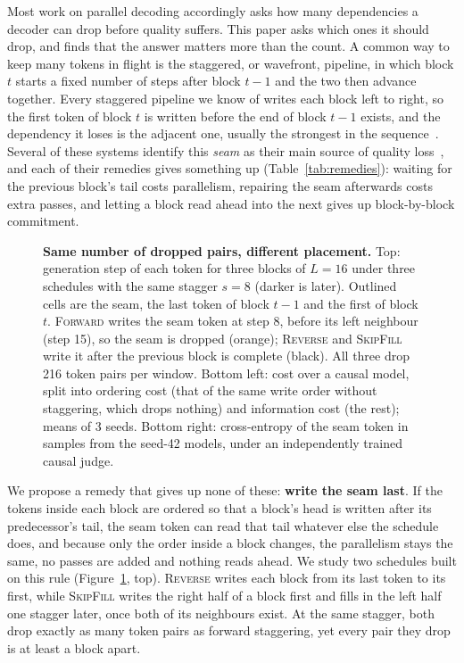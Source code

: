 \documentclass{article}
\theoremstyle{definition}
\theoremstyle{remark}
\newcommand{\name}[1]{\textup{\textsc{#1}}}
\newcommand{\sfill}{\name{SkipFill}\xspace}
\newcommand{\rev}{\name{Reverse}\xspace}
\newcommand{\fwd}{\name{Forward}\xspace}
\begin{document}
Most work on parallel decoding accordingly asks how many dependencies a decoder can drop before quality suffers.
This paper asks which ones it should drop, and finds that the answer matters more than the count.
A common way to keep many tokens in flight is the staggered, or wavefront, pipeline, in which block $t$ starts a fixed number of steps after block $t-1$ and the two then advance together.
Every staggered pipeline we know of writes each block left to right, so the first token of block $t$ is written before the end of block $t-1$ exists, and the dependency it loses is the adjacent one, usually the strongest in the sequence~\citep{wang2025par,li2025refusion}.
Several of these systems identify this \emph{seam} as their main source of quality loss~\citep{he2025zipar,li2026lclm,zhang2026latlm,he2026psf}, and each of their remedies gives something up (Table~\ref{tab:remedies}): waiting for the previous block's tail costs parallelism, repairing the seam afterwards costs extra passes, and letting a block read ahead into the next gives up block-by-block commitment.

\begin{figure}[t]
  \centering
  \resizebox{\textwidth}{!}{}
  \par\medskip
  
  \caption{\textbf{Same number of dropped pairs, different placement.}
  Top: generation step of each token for three blocks of $L=16$ under three schedules with the same stagger $s=8$ (darker is later). Outlined cells are the seam, the last token of block $t-1$ and the first of block $t$. \fwd writes the seam token at step 8, before its left neighbour (step 15), so the seam is dropped (orange); \rev and \sfill write it after the previous block is complete (black). All three drop 216 token pairs per window.
  Bottom left: cost over a causal model, split into ordering cost (that of the same write order without staggering, which drops nothing) and information cost (the rest); means of 3 seeds.
  Bottom right: cross-entropy of the seam token in samples from the seed-42 models, under an independently trained causal judge.}
  \label{fig:teaser}
\end{figure}

We propose a remedy that gives up none of these: \textbf{write the seam last}.
If the tokens inside each block are ordered so that a block's head is written after its predecessor's tail, the seam token can read that tail whatever else the schedule does, and because only the order inside a block changes, the parallelism stays the same, no passes are added and nothing reads ahead.
We study two schedules built on this rule (Figure~\ref{fig:teaser}, top).
\rev writes each block from its last token to its first, while \sfill writes the right half of a block first and fills in the left half one stagger later, once both of its neighbours exist.
At the same stagger, both drop exactly as many token pairs as forward staggering, yet every pair they drop is at least a block apart.
\end{document}
